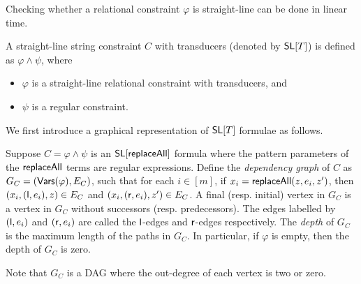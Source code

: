 \documentclass{llncs}
\begin{document}
\begin{remark}
	Checking whether a relational constraint $\varphi$ is straight-line can be done in linear time.
\end{remark}

\begin{definition}
	A straight-line string constraint $C$ with transducers (denoted by $\mathsf{SL}[T]$)  is defined as $ \varphi \wedge \psi$,  where
	\begin{itemize}
		\item $\varphi$ is a straight-line relational constraint with transducers,  and
		\item $\psi$ is a regular constraint.
	\end{itemize}
\end{definition}



 We first introduce a graphical representation of $\mathsf{SL}[T]$ formulae as follows.

 \begin{definition}
	\label{def:dep-graph}
	Suppose $C= \varphi \wedge \psi$ is an $\mathsf{SL}[\mathsf{replaceAll}]$ formula where the pattern parameters of the $\mathsf{replaceAll}$ terms are regular expressions. %
	Define the \emph{dependency graph} of $C$ as $G_C= (\mathsf{Vars}(\varphi), E_C)$, such that for each $i \in [m]$, if $x_i = \mathsf{replaceAll}(z, e_i, z')$, then $(x_i, (\mathsf{l}, e_i), z) \in E_C$ and $(x_i, (\mathsf{r}, e_i), z') \in E_C$. A final (resp. initial) vertex in $G_C$ is a vertex in $G_C$ without successors (resp. predecessors). The edges labelled by $(\mathsf{l}, e_i)$ and $(\mathsf{r}, e_i)$ are called the $\mathsf{l}$-edges and $\mathsf{r}$-edges respectively. The \emph{depth} of $G_C$ is the maximum length of the paths in $G_C$. In particular, if $\varphi$ is empty, then the depth of $G_C$ is zero.
 \end{definition}
 Note that $G_C$ is a DAG where the out-degree of each vertex is two or zero.
\end{document}
